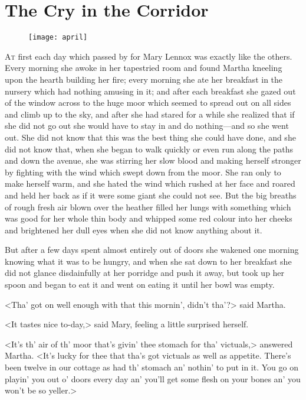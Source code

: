 \chapter{The Cry in the Corridor} 
	
\begin{figure}[t!]
\centering
\texttt{[image: april]}
\end{figure}

 \lettrine[]{A}{t} first each day which passed by for Mary Lennox was exactly like the others. Every morning she awoke in her tapestried room and found Martha kneeling upon the hearth building her fire; every morning she ate her breakfast in the nursery which had nothing amusing in it; and after each breakfast she gazed out of the window across to the huge moor which seemed to spread out on all sides and climb up to the sky, and after she had stared for a while she realized that if she did not go out she would have to stay in and do nothing—and so she went out. She did not know that this was the best thing she could have done, and she did not know that, when she began to walk quickly or even run along the paths and down the avenue, she was stirring her slow blood and making herself stronger by fighting with the wind which swept down from the moor. She ran only to make herself warm, and she hated the wind which rushed at her face and roared and held her back as if it were some giant she could not see. But the big breaths of rough fresh air blown over the heather filled her lungs with something which was good for her whole thin body and whipped some red colour into her cheeks and brightened her dull eyes when she did not know anything about it.

But after a few days spent almost entirely out of doors she wakened one morning knowing what it was to be hungry, and when she sat down to her breakfast she did not glance disdainfully at her porridge and push it away, but took up her spoon and began to eat it and went on eating it until her bowl was empty.

<Tha' got on well enough with that this mornin', didn't tha'?> said Martha.

<It tastes nice to-day,> said Mary, feeling a little surprised herself.

<It's th' air of th' moor that's givin' thee stomach for tha' victuals,> answered Martha. <It's lucky for thee that tha's got victuals as well as appetite. There's been twelve in our cottage as had th' stomach an' nothin' to put in it. You go on playin' you out o' doors every day an' you'll get some flesh on your bones an' you won't be so yeller.>

